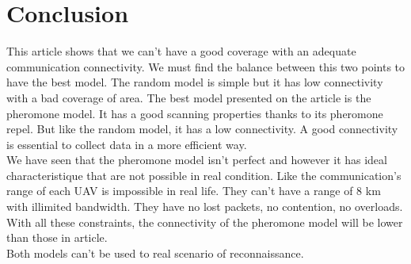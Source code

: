 \chapter{Conclusion}

This article shows that we can't have a good coverage with an adequate communication connectivity. We must find the balance between this two points to have the best model. The random model is simple but it has low connectivity with a bad coverage of area. The best model presented on the article is the pheromone model. It has a good scanning properties thanks to its pheromone repel. But like the random model, it has a low connectivity. A good connectivity is essential to collect data in a more efficient way.\\

We have seen that the pheromone model isn't perfect and however it has ideal characteristique that are not possible in real condition. Like the communication's range of each UAV is impossible in real life. They can't have a range of 8 km with illimited bandwidth. They have no lost packets,  no contention, no overloads. With all these constraints, the connectivity of the pheromone model will be lower than those in article.\\
Both models can't be used to real scenario of reconnaissance.